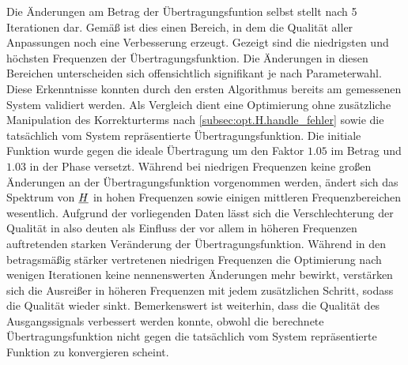 \documentclass[../Report.tex]{subfiles}
\begin{document}
\noindent
Die Änderungen am Betrag der Übertragungsfuntion selbst stellt  nach 5 Iterationen dar. Gemäß  ist dies einen Bereich, in dem die Qualität aller Anpassungen noch eine Verbesserung erzeugt.
Gezeigt sind die niedrigsten und höchsten Frequenzen der Übertragungsfunktion. Die Änderungen in diesen Bereichen unterscheiden sich offensichtlich signifikant je nach Parameterwahl. 
Diese Erkenntnisse konnten durch den ersten Algorithmus bereits am gemessenen System validiert werden.
Als Vergleich dient eine Optimierung ohne zusätzliche Manipulation des Korrekturterms nach \ref{subsec:opt.H.handle_fehler} sowie die tatsächlich vom \mock System repräsentierte Übertragungsfunktion.
Die initiale Funktion wurde gegen die ideale Übertragung um den Faktor $1.05$ im Betrag und $1.03$ in der Phase versetzt.
Während bei niedrigen Frequenzen keine großen Änderungen an der Übertragungsfunktion vorgenommen werden, ändert sich das Spektrum von $\underline{H}$ in hohen Frequenzen sowie einigen mittleren Frequenzbereichen wesentlich. 
Aufgrund der vorliegenden Daten lässt sich die Verschlechterung der Qualität in  also deuten als Einfluss der vor allem in höheren Frequenzen auftretenden starken Veränderung der Übertragungsfunktion. Während in den betragsmäßig stärker vertretenen niedrigen Frequenzen die Optimierung nach wenigen Iterationen keine nennenswerten Änderungen mehr bewirkt, verstärken sich die Ausreißer in höheren Frequenzen mit jedem zusätzlichen Schritt, sodass die Qualität wieder sinkt. 
Bemerkenswert ist weiterhin, dass die Qualität des Ausgangssignals verbessert werden konnte, obwohl die berechnete Übertragungsfunktion nicht gegen die tatsächlich vom \mock System repräsentierte Funktion zu konvergieren scheint.


 \Hmock 
{} \Hinit 
{} \HsimpleFive 
{} \HpromFive 
{} \HrmsFive
{} \HzeroFive
\end{document}
